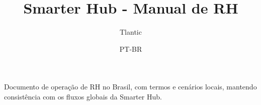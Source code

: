 \documentclass[11pt,a4paper]{report}
\title{Smarter Hub - Manual de RH}
\author{Tlantic}
\date{PT-BR}
\begin{document}
\maketitle
\begin{manualnote}
Documento de operação de RH no Brasil, com termos e cenários locais, mantendo consistência com os fluxos globais da Smarter Hub.
\end{manualnote}
\tableofcontents

\end{document}
